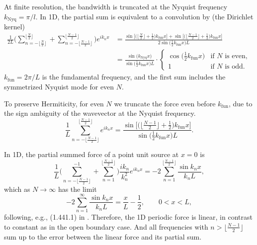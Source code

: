 \documentclass[a4paper]{article}
\newcommand{\1}{\mathds{1}}
\newcommand{\knyq}{k_\mathrm{Nyq}}
\newcommand{\kfun}{k_\mathrm{fun}}
\begin{document}
At finite resolution, the bandwidth is truncated at the Nyquist
frequency $\knyq = \pi / l$.
In 1D, the partial sum is equivalent to a convolution by (the Dirichlet
kernel)
%
\begin{align}
\frac1{2 L} \Bigg(
  \sum_{n=-\lfloor\frac{N}2\rfloor}^{\lfloor\frac{N}2\rfloor}
  + \sum_{n=-\lfloor\frac{N-1}2\rfloor}^{\lfloor\frac{N-1}2\rfloor}
\Bigg) e^{i k_n x}
%
&= \frac{
  \sin \bigl[
    \bigl( \bigl\lfloor\frac{N}2\bigr\rfloor + \frac12 \bigr) \kfun x
  \bigr]
  + \sin \bigl[
    \bigl( \bigl\lfloor\frac{N-1}2\bigr\rfloor + \frac12 \bigr) \kfun x
  \bigr]
}{2 \sin \bigl( \frac12 \kfun x \bigr) L} \nonumber\\
%
&= \frac{\sin \bigl( \knyq x \bigr)}
        {\sin \bigl( \frac12 \kfun x \bigr) L}
\cdot \begin{cases}
  \cos \bigl( \frac12 \kfun x \bigr) & \text{if } N \text{ is even}, \\
  1 & \text{if } N \text{ is odd}.
\end{cases}
\end{align}
%
$\kfun = 2\pi / L$ is the fundamental frequency, and the first sum
includes the symmetrized Nyquist mode for even $N$.

To preserve Hermiticity, for even $N$ we truncate the force even before
$\kfun$, due to the sign ambiguity of the wavevector at the Nyquist
frequency.
%
\begin{equation}
\frac1L \sum_{n=-\lfloor\frac{N-1}2\rfloor}^{\lfloor\frac{N-1}2\rfloor}
  e^{i k_n x}
%
= \frac{\sin \bigl[
  \bigl( \bigl\lfloor\frac{N-1}2\bigr\rfloor + \frac12 \bigr) \kfun x
\bigr]}{\sin \bigl( \frac12 \kfun x \bigr) L}.
\end{equation}
%

In 1D, the partial summed force of a point unit source at $x=0$ is
%
\begin{equation}
\frac1L \Bigg(
  \sum_{n=-\lfloor\frac{N-1}2\rfloor}^{-1}
  + \sum_{n=1}^{\lfloor\frac{N-1}2\rfloor}
\Bigg) \frac{i k_n}{k_n^2} e^{i k_n x}
= -2 \sum_{n=1}^{\lfloor\frac{N-1}2\rfloor} \frac{\sin k_n x}{k_n L},
\end{equation}
%
which as $N\to\infty$ has the limit
%
\begin{equation}
-2 \sum_{n=1}^\infty \frac{\sin k_n x}{k_n L} = \frac{x}L - \frac12,
\qquad 0 < x < L,
\end{equation}
%
following, e.g., (1.441.1) in \cite{TISP}.
Therefore, the 1D periodic force is linear, in contrast to constant as
in the open boundary case.
And all frequencies with $n > \lfloor\frac{N-1}2\rfloor$ sum up to the
error between the linear force and its partial sum.
\end{document}
